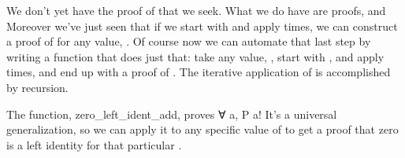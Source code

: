 \documentclass[letterpaper,10pt,english]{sphinxmanual}
\begin{document}
\sphinxAtStartPar
We don’t yet have the proof of  that
we seek. What we do have are proofs, 
and  Moreover we’ve
just seen that if we start with  and apply
 times, we can construct a proof of 
for any value, . Of course now we can automate
that last step by writing a function that does
just that: take any value, , start with ,
and apply  times, and end up with a proof
of . The iterative application of  is
accomplished by recursion.

\begin{sphinxVerbatim}[commandchars=\\\{\}]
           
   
       
\end{sphinxVerbatim}

\sphinxAtStartPar
The function, zero\_left\_ident\_add, proves ∀ a, P a!
It’s a universal generalization, so we can apply it to any
specific value of  to get a proof that zero is a left
identity for that particular .

\begin{sphinxVerbatim}[commandchars=\\\{\}]
  
  
  
  
\end{sphinxVerbatim}
\end{document}
